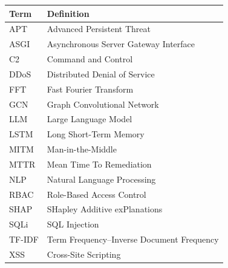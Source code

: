 \documentclass[12pt, a4paper]{report}
\begin{document}
\begin{table}[H]
\centering
\begin{tabular}{l l}
\toprule
\textbf{Term} & \textbf{Definition} \\
\midrule
APT & Advanced Persistent Threat \\
ASGI & Asynchronous Server Gateway Interface \\
C2 & Command and Control \\
DDoS & Distributed Denial of Service \\
FFT & Fast Fourier Transform \\
GCN & Graph Convolutional Network \\
LLM & Large Language Model \\
LSTM & Long Short-Term Memory \\
MITM & Man-in-the-Middle \\
MTTR & Mean Time To Remediation \\
NLP & Natural Language Processing \\
RBAC & Role-Based Access Control \\
SHAP & SHapley Additive exPlanations \\
SQLi & SQL Injection \\
TF-IDF & Term Frequency--Inverse Document Frequency \\
XSS & Cross-Site Scripting \\
\bottomrule
\end{tabular}
\end{table}
\end{document}
